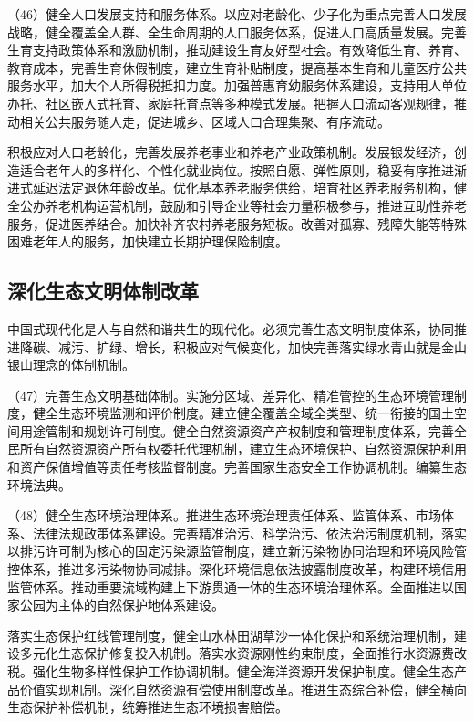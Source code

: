     （46）健全人口发展支持和服务体系。以应对老龄化、少子化为重点完善人口发展战略，健全覆盖全人群、全生命周期的人口服务体系，促进人口高质量发展。完善生育支持政策体系和激励机制，推动建设生育友好型社会。有效降低生育、养育、教育成本，完善生育休假制度，建立生育补贴制度，提高基本生育和儿童医疗公共服务水平，加大个人所得税抵扣力度。加强普惠育幼服务体系建设，支持用人单位办托、社区嵌入式托育、家庭托育点等多种模式发展。把握人口流动客观规律，推动相关公共服务随人走，促进城乡、区域人口合理集聚、有序流动。

    积极应对人口老龄化，完善发展养老事业和养老产业政策机制。发展银发经济，创造适合老年人的多样化、个性化就业岗位。按照自愿、弹性原则，稳妥有序推进渐进式延迟法定退休年龄改革。优化基本养老服务供给，培育社区养老服务机构，健全公办养老机构运营机制，鼓励和引导企业等社会力量积极参与，推进互助性养老服务，促进医养结合。加快补齐农村养老服务短板。改善对孤寡、残障失能等特殊困难老年人的服务，加快建立长期护理保险制度。

    \subsection{深化生态文明体制改革}

    中国式现代化是人与自然和谐共生的现代化。必须完善生态文明制度体系，协同推进降碳、减污、扩绿、增长，积极应对气候变化，加快完善落实绿水青山就是金山银山理念的体制机制。

    （47）完善生态文明基础体制。实施分区域、差异化、精准管控的生态环境管理制度，健全生态环境监测和评价制度。建立健全覆盖全域全类型、统一衔接的国土空间用途管制和规划许可制度。健全自然资源资产产权制度和管理制度体系，完善全民所有自然资源资产所有权委托代理机制，建立生态环境保护、自然资源保护利用和资产保值增值等责任考核监督制度。完善国家生态安全工作协调机制。编纂生态环境法典。

    （48）健全生态环境治理体系。推进生态环境治理责任体系、监管体系、市场体系、法律法规政策体系建设。完善精准治污、科学治污、依法治污制度机制，落实以排污许可制为核心的固定污染源监管制度，建立新污染物协同治理和环境风险管控体系，推进多污染物协同减排。深化环境信息依法披露制度改革，构建环境信用监管体系。推动重要流域构建上下游贯通一体的生态环境治理体系。全面推进以国家公园为主体的自然保护地体系建设。

    落实生态保护红线管理制度，健全山水林田湖草沙一体化保护和系统治理机制，建设多元化生态保护修复投入机制。落实水资源刚性约束制度，全面推行水资源费改税。强化生物多样性保护工作协调机制。健全海洋资源开发保护制度。健全生态产品价值实现机制。深化自然资源有偿使用制度改革。推进生态综合补偿，健全横向生态保护补偿机制，统筹推进生态环境损害赔偿。

